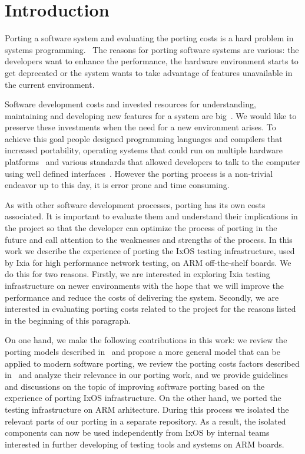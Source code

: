 \chapter{Introduction}\pagestyle{fancy}

Porting a software system and evaluating the porting costs is a hard problem in
systems
programming.~\cite{tanaka,hakuta,mooney2004developing,kanai,porquet2015,
bodenstab1984unix,osdevcrossport,jolitz1990porting,frakes1995sixteen,
tanenbaum1978guidelines,johnson1978unix}
The reasons for porting software systems are various: the developers want to
enhance the performance, the hardware environment starts to get deprecated or
the system wants to take advantage of features unavailable in the current
environment.

Software development costs and invested resources for understanding, maintaining
and developing new features for a system are
big~\cite{xia2017measuring,boehm2000software,morgan1994controlling}. We would
like to preserve these investments when the need for a new environment arises.
To achieve this goal people designed programming languages and compilers that
increased portability, operating systems that could run on multiple hardware
platforms~\cite{johnson1978unix} and various standards that allowed developers to talk to
the computer using well defined interfaces~\cite{walli1995posix}. However the porting
process is a non-trivial endeavor up to this day, it is error prone and time
consuming.

As with other software development processes, porting has its own costs
associated. It is important to evaluate them and understand their implications
in the project so that the developer can optimize the process of porting in the
future and call attention to the weaknesses and strengths of the process. In
this work we describe the experience of porting the IxOS testing infrastructure,
used by Ixia for high performance network testing, on ARM off-the-shelf boards.
We do this for two reasons. Firstly, we are interested in exploring Ixia testing
infrastructure on newer environments with the hope that we will improve the
performance and reduce the costs of delivering the system. Secondly, we are
interested in evaluating porting costs related to the project for the reasons
listed in the beginning of this paragraph. 

On one hand, we make the following contributions in this work: we review the
porting models described in~\cite{tanaka,hakuta,kanai} and propose a more
general model that can be applied to modern software porting, we review the
porting costs factors described in~\cite{hakuta} and analyze their relevance in
our porting work, and we provide guidelines and discussions on the topic of
improving software porting based on the experience of porting IxOS
infrastructure. On the other hand, we ported the testing infrastructure on ARM
arhitecture. During this process we isolated the relevant parts of our porting
in a separate repository. As a result, the isolated components can now be used
independently from IxOS by internal teams interested in further developing of
testing tools and systems on ARM boards.

